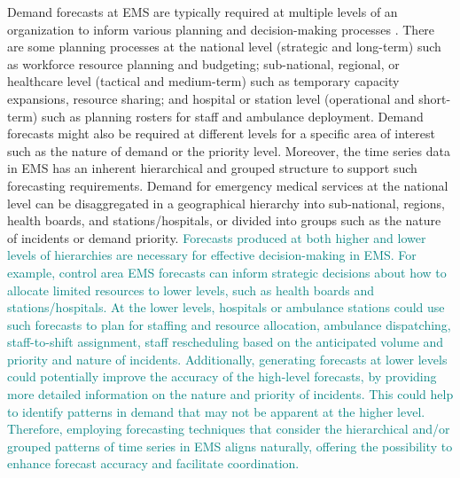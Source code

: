 \documentclass[
  authoryear,
  preprint,
  3p]{elsarticle}
\begin{document}
Demand forecasts at EMS are typically required at multiple levels of an
organization to inform various planning and decision-making processes
\citep{hulshof2012taxonomic}. There are some planning processes at the
national level (strategic and long-term) such as workforce resource
planning and budgeting; sub-national, regional, or healthcare level
(tactical and medium-term) such as temporary capacity expansions,
resource sharing; and hospital or station level (operational and
short-term) such as planning rosters for staff and ambulance deployment.
Demand forecasts might also be required at different levels for a
specific area of interest such as the nature of demand or the priority
level. Moreover, the time series data in EMS has an inherent
hierarchical and grouped structure to support such forecasting
requirements. Demand for emergency medical services at the national
level can be disaggregated in a geographical hierarchy into
sub-national, regions, health boards, and stations/hospitals, or divided
into groups such as the nature of incidents or demand priority.
\textcolor{teal}{Forecasts produced at both higher and lower levels of hierarchies are necessary for effective decision-making in EMS. For example, control area EMS forecasts can inform strategic decisions about how to allocate limited resources to lower levels, such as health boards and stations/hospitals. At the lower levels, hospitals or ambulance stations could use such forecasts to plan for staffing and resource allocation, ambulance dispatching, staff-to-shift assignment, staff rescheduling based on the anticipated volume and priority and nature of incidents. Additionally, generating forecasts at lower levels could potentially improve the accuracy of the high-level forecasts, by providing more detailed information on the nature and priority of incidents. This could help to identify patterns in demand that may not be apparent at the higher level. Therefore, employing forecasting techniques that consider the hierarchical and/or grouped patterns of time series in EMS aligns naturally, offering the possibility to enhance forecast accuracy and facilitate coordination.}
\end{document}
